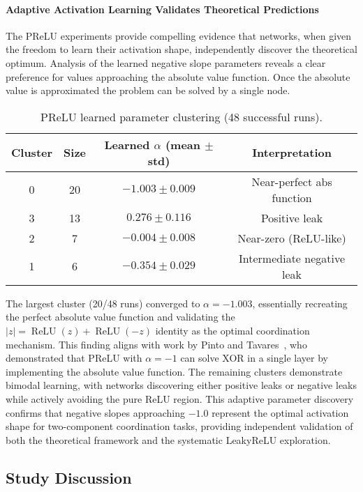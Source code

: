 \paragraph{Adaptive Activation Learning Validates Theoretical Predictions}
The PReLU experiments provide compelling evidence that networks, when given the freedom to learn their activation shape, independently discover the theoretical optimum. Analysis of the learned negative slope parameters reveals a clear preference for values approaching the absolute value function. Once the absolute value is approximated the problem can be solved by a single node.

\begin{table}[ht]
\centering
\caption{PReLU learned parameter clustering (48 successful runs).}
\label{tab:relu1-prelu-learned}
\begin{tabular}{cccc}
\toprule
Cluster & Size & Learned $\alpha$ (mean $\pm$ std) & Interpretation \\
\midrule
0 & 20 & $-1.003 \pm 0.009$ & Near-perfect abs function \\
3 & 13 & $0.276 \pm 0.116$ & Positive leak \\
2 & 7 & $-0.004 \pm 0.008$ & Near-zero (ReLU-like) \\
1 & 6 & $-0.354 \pm 0.029$ & Intermediate negative leak \\
\bottomrule
\end{tabular}
\end{table}

The largest cluster (20/48 runs) converged to $\alpha = -1.003$, essentially recreating the perfect absolute value function and validating the $|z| = \operatorname{ReLU}(z) + \operatorname{ReLU}(-z)$ identity as the optimal coordination mechanism. This finding aligns with work by Pinto and Tavares~\cite{pinto2024prelu}, who demonstrated that PReLU with $\alpha = -1$ can solve XOR in a single layer by implementing the absolute value function. The remaining clusters demonstrate bimodal learning, with networks discovering either positive leaks or negative leaks while actively avoiding the pure ReLU region. This adaptive parameter discovery confirms that negative slopes approaching $-1.0$ represent the optimal activation shape for two-component coordination tasks, providing independent validation of both the theoretical framework and the systematic LeakyReLU exploration.


\subsection*{Study Discussion}

